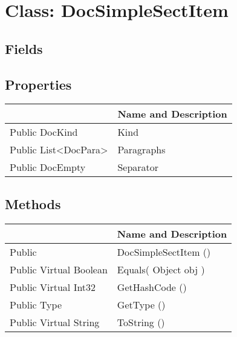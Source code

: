 \documentclass[11pt, oneside, a4paper]{book}
\begin{document}
\hypertarget{SoftwareEngineeringTools.{}Documentation.{}DocSimpleSectItem}{}
\section{Class: DocSimpleSectItem}

\subsection{Fields}

\subsection{Properties}
\begin{center}
\begin{tabular}{| p{3cm} | p{12cm} | }
\hline
\textbf{ } & \textbf{ Name and Description}\\
\hline
 Public  DocKind &  Kind\hypertarget{SoftwareEngineeringTools.{}Documentation.{}DocSimpleSectItem.{}Kind}{}\\
\hline
 Public  List<DocPara> &  Paragraphs\hypertarget{SoftwareEngineeringTools.{}Documentation.{}DocSimpleSectItem.{}Paragraphs}{}\\
\hline
 Public  DocEmpty &  Separator\hypertarget{SoftwareEngineeringTools.{}Documentation.{}DocSimpleSectItem.{}Separator}{}\\
\hline
\end{tabular}
\end{center}

\subsection{Methods}
\begin{center}
\begin{tabular}{| p{3cm} | p{12cm} | }
\hline
\textbf{ } & \textbf{ Name and Description}\\
\hline
 Public  &  DocSimpleSectItem ()\hypertarget{SoftwareEngineeringTools.{}Documentation.{}DocSimpleSectItem.{}DocSimpleSectItem}{}\\
\hline
 Public  Virtual  Boolean &  Equals(\hypertarget{SoftwareEngineeringTools.{}Documentation.{}DocSimpleSectItem.{}Equals\_Object}{} Object  obj  )\\
\hline
 Public  Virtual  Int32 &  GetHashCode ()\hypertarget{SoftwareEngineeringTools.{}Documentation.{}DocSimpleSectItem.{}GetHashCode}{}\\
\hline
 Public  Type &  GetType ()\hypertarget{SoftwareEngineeringTools.{}Documentation.{}DocSimpleSectItem.{}GetType}{}\\
\hline
 Public  Virtual  String &  ToString ()\hypertarget{SoftwareEngineeringTools.{}Documentation.{}DocSimpleSectItem.{}ToString}{}\\
\hline
\end{tabular}
\end{center}
 
\end{document}
